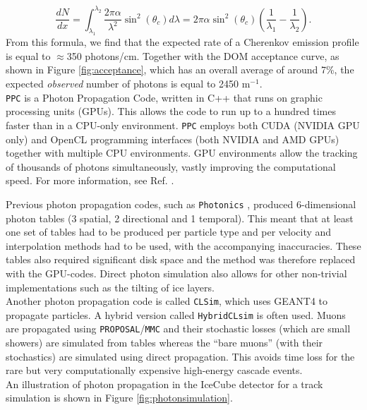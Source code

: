 \begin{equation}
\frac{dN}{dx} = \int_{\lambda_1}^{\lambda_2} \frac{2 \pi \alpha}{\lambda^2} \sin^2 \left(\theta_c\right) d\lambda = 2\pi \alpha \sin^2 \left(\theta_c\right) \left(\frac{1}{\lambda_1} -\frac{1}{\lambda_2}\right).
\end{equation}
From this formula, we find that the expected rate of a Cherenkov emission profile is equal to $\approx$350 photons/cm. Together with the DOM acceptance curve, as shown in Figure \ref{fig:acceptance}, which has an overall average of around 7\%, the expected \textit{observed} number of photons is equal to 2450 m$^{-1}$.\\

\noindent \texttt{PPC} is a Photon Propagation Code, written in C++ that runs on graphic processing units (GPUs). This allows the code to run up to a hundred times faster than in a CPU-only environment. \texttt{PPC} employs both CUDA (NVIDIA GPU only) and OpenCL programming interfaces (both NVIDIA and AMD GPUs) together with multiple CPU environments.
GPU environments allow the tracking of thousands of photons simultaneously, vastly improving the computational speed. For more information, see Ref. \cite{dimaspice}.

Previous photon propagation codes, such as \texttt{Photonics}  \cite{Lundberg:2007mf}, produced 6-dimensional photon tables (3 spatial, 2 directional and 1 temporal). This meant that at least one set of tables had to be produced per particle type and per velocity and interpolation methods had to be used, with the accompanying inaccuracies. These tables also required significant disk space and the method was therefore replaced with the GPU-codes. Direct photon simulation also allows for other non-trivial implementations such as the tilting of ice layers.\\

\noindent Another photon propagation code is called \texttt{CLSim}, which uses GEANT4 to propagate particles. A hybrid version called \texttt{HybridCLsim} is often used. Muons are propagated using \texttt{PROPOSAL}/\texttt{MMC}  and their stochastic losses (which are small showers) are simulated from tables whereas the ``bare muons'' (with their stochastics) are simulated using direct propagation. This avoids time loss for the rare but very computationally expensive high-energy cascade events.\\

\noindent An illustration of photon propagation in the IceCube detector for a track simulation is shown in Figure \ref{fig:photonsimulation}.

